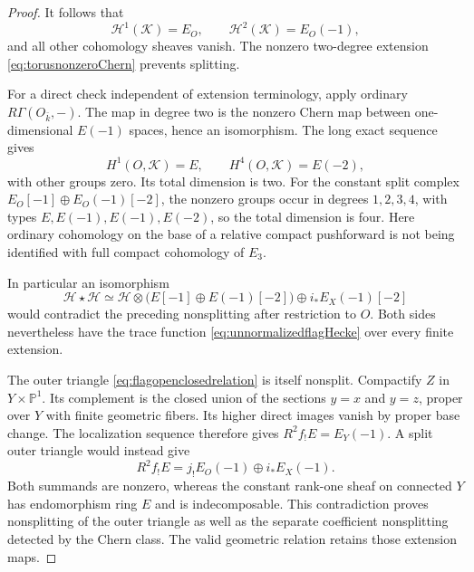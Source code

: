 \documentclass[11pt,a4paper]{article}
\theoremstyle{named}\newtheorem{finding}{Finding}[section]
\theoremstyle{definition}\newtheorem{definition}[finding]{Definition}
\theoremstyle{remark}\newtheorem{remark}[finding]{Remark}
\begin{document}
\begin{proof}
It follows that
\[
 \mathcal H^1(\mathcal K)=E_O,\qquad
 \mathcal H^2(\mathcal K)=E_O(-1),
\]
and all other cohomology sheaves vanish. The nonzero
two-degree extension \eqref{eq:torusnonzeroChern} prevents
splitting.

For a direct check independent of extension terminology,
apply ordinary \(R\Gamma(O_{\bar k},-)\).
The map in degree two is the nonzero Chern map between
one-dimensional \(E(-1)\) spaces, hence an isomorphism.
The long exact sequence gives
\begin{equation}\label{eq:relativeTorusHypercohomology}
 H^1(O,\mathcal K)=E,\qquad
 H^4(O,\mathcal K)=E(-2),
\end{equation}
with other groups zero.
Its total dimension is two. For the constant split complex
\(E_O[-1]\oplus E_O(-1)[-2]\), the nonzero groups occur
in degrees \(1,2,3,4\), with types
\(E,E(-1),E(-1),E(-2)\), so the total dimension is four.
Here ordinary cohomology on the base of a relative compact
pushforward is not being identified with full compact
cohomology of \(E_3\).

In particular an isomorphism
\[
 \mathcal H\star\mathcal H\simeq
 \mathcal H\otimes\bigl(E[-1]\oplus E(-1)[-2]\bigr)
       \oplus i_*E_X(-1)[-2]
\]
would contradict the preceding nonsplitting after restriction
to \(O\).
Both sides nevertheless have the trace function
\eqref{eq:unnormalizedflagHecke} over every finite extension.

The outer triangle \eqref{eq:flagopenclosedrelation} is
itself nonsplit. Compactify \(Z\) in \(Y\times\mathbb P^1\).
Its complement is the closed union of the sections \(y=x\)
and \(y=z\), proper over \(Y\) with finite geometric fibers.
Its higher direct images vanish by proper base change.
The localization sequence therefore gives
\(R^2f_!E=E_Y(-1)\).
A split outer triangle would instead give
\[
 R^2f_!E=j_!E_O(-1)\oplus i_*E_X(-1).
\]
Both summands are nonzero, whereas the constant rank-one
sheaf on connected \(Y\) has endomorphism ring \(E\) and
is indecomposable. This contradiction proves nonsplitting
of the outer triangle as well as the separate coefficient
nonsplitting detected by the Chern class.
The valid geometric relation retains those extension maps.
\end{proof}
\end{document}
